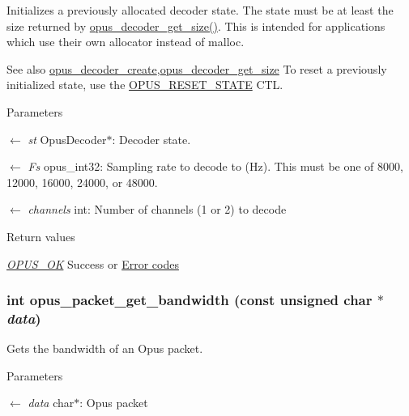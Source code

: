 Initializes a previously allocated decoder state. The state must be at least the size returned by \hyperlink{group__opus__decoder_gac918415b2ee21add75b7f867ce235011}{opus\_\-decoder\_\-get\_\-size()}. This is intended for applications which use their own allocator instead of malloc. \begin{DoxySeeAlso}{See also}
\hyperlink{group__opus__decoder_ga753f6fe0b699c81cfd47d70c8e15a0bd}{opus\_\-decoder\_\-create},\hyperlink{group__opus__decoder_gac918415b2ee21add75b7f867ce235011}{opus\_\-decoder\_\-get\_\-size} To reset a previously initialized state, use the \hyperlink{group__opus__genericctls_gadc74e4fa8bcdf9994187d52d92207337}{OPUS\_\-RESET\_\-STATE} CTL. 
\end{DoxySeeAlso}

\begin{DoxyParams}{Parameters}
\item[\mbox{$\leftarrow$} {\em st}]{\ttfamily OpusDecoder$\ast$}: Decoder state. \item[\mbox{$\leftarrow$} {\em Fs}]{\ttfamily opus\_\-int32}: Sampling rate to decode to (Hz). This must be one of 8000, 12000, 16000, 24000, or 48000. \item[\mbox{$\leftarrow$} {\em channels}]{\ttfamily int}: Number of channels (1 or 2) to decode \end{DoxyParams}

\begin{DoxyRetVals}{Return values}
\item[{\em \hyperlink{group__opus__errorcodes_gaa44cf8a185e1b5cb940ef63eb4f02d21}{OPUS\_\-OK}}]Success or \hyperlink{group__opus__errorcodes}{Error codes} \end{DoxyRetVals}
\hypertarget{group__opus__decoder_ga89b9375b6ff5e15f07fdc5d0cf4f0053}{
\subsubsection[{opus\_\-packet\_\-get\_\-bandwidth}]{\setlength{\rightskip}{0pt plus 5cm}int opus\_\-packet\_\-get\_\-bandwidth (const unsigned char $\ast$ {\em data})}}
\label{group__opus__decoder_ga89b9375b6ff5e15f07fdc5d0cf4f0053}


Gets the bandwidth of an Opus packet. 
\begin{DoxyParams}{Parameters}
\item[\mbox{$\leftarrow$} {\em data}]{\ttfamily char$\ast$}: Opus packet \end{DoxyParams}

